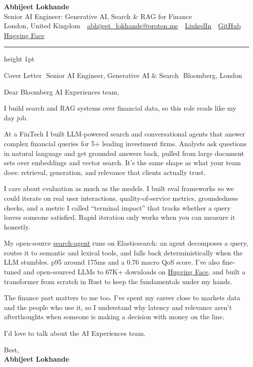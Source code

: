 \documentclass[10pt,a4paper]{article}
\newcommand{\sep}{\,\textcolor{accent!60}{\textbar}\,}
\begin{document}
\begin{center}
  {\fontsize{22}{24}\selectfont\bfseries Abhijeet Lokhande}\\[3pt]
  {\color{accent}\large Senior AI Engineer: Generative AI, Search \& RAG for Finance}\\[5pt]
  {\small
    London, United Kingdom \sep
    \href{mailto:abhijeet_lokhande@proton.me}{abhijeet\_lokhande@proton.me} \sep
    \href{https://www.linkedin.com/in/ablds/}{LinkedIn} \sep
    \href{https://github.com/abhijeetscode}{GitHub} \sep
    \href{https://huggingface.co/ab-ai}{Hugging Face}
  }
\end{center}

{\color{accent!35}\hrule height 1pt}
\vspace{4pt}

{\color{muted}\small Cover Letter \sep Senior AI Engineer, Generative AI \& Search \sep Bloomberg, London}

\vspace{2pt}

Dear Bloomberg AI Experiences team,

I build search and RAG systems over financial data, so this role reads like my day job.

At a FinTech I built LLM-powered search and conversational agents that answer complex financial queries for 5+ leading investment firms. Analysts ask questions in natural language and get grounded answers back, pulled from large document sets over embeddings and vector search. It's the same shape as what your team does: retrieval, generation, and relevance that clients actually trust.

I care about evaluation as much as the models. I built eval frameworks so we could iterate on real user interactions, quality-of-service metrics, groundedness checks, and a metric I called ``terminal impact'' that tracks whether a query leaves someone satisfied. Rapid iteration only works when you can measure it honestly.

My open-source \href{https://github.com/abhijeetscode/search-agent}{search-agent} runs on Elasticsearch: an agent decomposes a query, routes it to semantic and lexical tools, and falls back deterministically when the LLM stumbles. p95 around 175ms and a 0.76 macro QoS score. I've also fine-tuned and open-sourced LLMs to 67K+ downloads on \href{https://huggingface.co/ab-ai}{Hugging Face}, and built a transformer from scratch in Rust to keep the fundamentals under my hands.

The finance part matters to me too. I've spent my career close to markets data and the people who use it, so I understand why latency and relevance aren't afterthoughts when someone is making a decision with money on the line.

I'd love to talk about the AI Experiences team.

\vspace{4pt}
Best,\\
{\color{company}\bfseries Abhijeet Lokhande}
\end{document}
